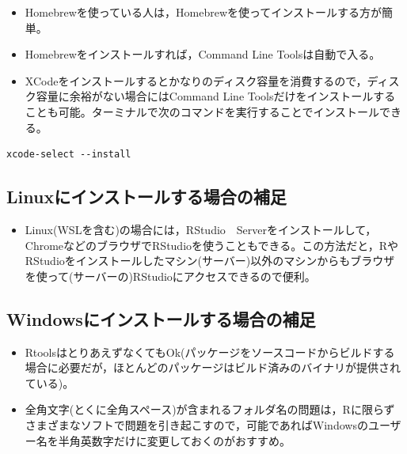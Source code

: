 \documentclass[
]{book}
\providecommand{\tightlist}{%
  \setlength{\itemsep}{0pt}\setlength{\parskip}{0pt}}
\begin{document}
\begin{itemize}
\tightlist
\item
  Homebrewを使っている人は，Homebrewを使ってインストールする方が簡単。
\item
  Homebrewをインストールすれば，Command Line Toolsは自動で入る。
\item
  XCodeをインストールするとかなりのディスク容量を消費するので，ディスク容量に余裕がない場合にはCommand Line Toolsだけをインストールすることも可能。ターミナルで次のコマンドを実行することでインストールできる。
\end{itemize}

\begin{verbatim}
xcode-select --install
\end{verbatim}

\hypertarget{linuxux306bux30a4ux30f3ux30b9ux30c8ux30fcux30ebux3059ux308bux5834ux5408ux306eux88dcux8db3}{%
\subsection{Linuxにインストールする場合の補足}\label{linuxux306bux30a4ux30f3ux30b9ux30c8ux30fcux30ebux3059ux308bux5834ux5408ux306eux88dcux8db3}}

\begin{itemize}
\tightlist
\item
  Linux(WSLを含む)の場合には，RStudio　Serverをインストールして，ChromeなどのブラウザでRStudioを使うこともできる。この方法だと，RやRStudioをインストールしたマシン(サーバー)以外のマシンからもブラウザを使って(サーバーの)RStudioにアクセスできるので便利。
\end{itemize}

\hypertarget{windowsux306bux30a4ux30f3ux30b9ux30c8ux30fcux30ebux3059ux308bux5834ux5408ux306eux88dcux8db3}{%
\subsection{Windowsにインストールする場合の補足}\label{windowsux306bux30a4ux30f3ux30b9ux30c8ux30fcux30ebux3059ux308bux5834ux5408ux306eux88dcux8db3}}

\begin{itemize}
\tightlist
\item
  RtoolsはとりあえずなくてもOk(パッケージをソースコードからビルドする場合に必要だが，ほとんどのパッケージはビルド済みのバイナリが提供されている)。
\item
  全角文字(とくに全角スペース)が含まれるフォルダ名の問題は，Rに限らずさまざまなソフトで問題を引き起こすので，可能であればWindowsのユーザー名を半角英数字だけに変更しておくのがおすすめ。
\end{itemize}
\end{document}
